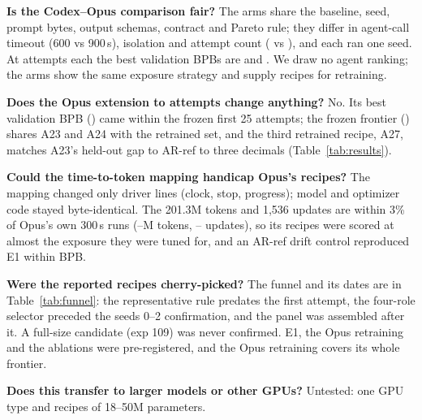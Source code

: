 \documentclass{article}
\begin{document}
\textbf{Is the Codex--Opus comparison fair?} The arms share the baseline, seed, prompt bytes, output schemas, contract and Pareto rule; they differ in agent-call timeout (600 vs 900\,s), isolation and attempt count (\CRCxAttempts{} vs \CROpAttempts), and each ran one seed. At \CRCxAttempts{} attempts each the best validation BPBs are \CRCxBestBPB{} and \CROpBestTwentyTwo. We draw no agent ranking; the arms show the same exposure strategy and supply recipes for retraining.

\textbf{Does the Opus extension to \CROpAttempts{} attempts change anything?} No. Its best validation BPB (\CROpBestFrozen) came within the frozen first 25 attempts; the frozen frontier (\CROpFrontierFrozen) shares A23 and A24 with the retrained set, and the third retrained recipe, A27, matches A23's held-out gap to AR-ref to three decimals (Table~\ref{tab:results}).

\textbf{Could the time-to-token mapping handicap Opus's recipes?} The mapping changed only driver lines (clock, stop, progress); model and optimizer code stayed byte-identical. The 201.3M tokens and 1{,}536 updates are within 3\% of Opus's own 300\,s runs (\CROpTokLo--\CROpTokHi M tokens, \CROpUpdLo--\CROpUpdHi{} updates), so its recipes were scored at almost the exposure they were tuned for, and an AR-ref drift control reproduced E1 within \CRMTDriftAbs{} BPB.

\textbf{Were the reported recipes cherry-picked?} The funnel and its dates are in Table~\ref{tab:funnel}: the representative rule predates the first attempt, the four-role selector preceded the seeds 0--2 confirmation, and the panel was assembled after it. A full-size candidate (exp 109) was never confirmed. E1, the Opus retraining and the ablations were pre-registered, and the Opus retraining covers its whole frontier.

\textbf{Does this transfer to larger models or other GPUs?} Untested: one GPU type and recipes of 18--50M parameters.
\end{document}
